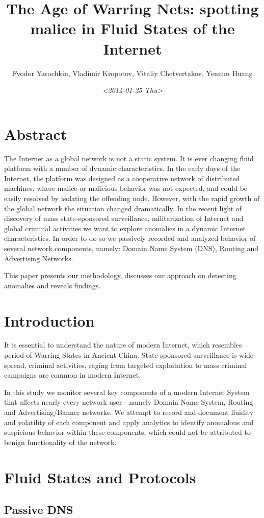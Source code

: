 \documentclass[times,5pt]{article}
\author{Fyodor Yarochkin, Vladimir Kropotov, Vitaliy Chetvertakov, Yennun Huang}
\date{\textit{<2014-01-25 Thu>}}
\title{The Age of Warring Nets: spotting malice in Fluid States of the Internet}
\begin{document}
\maketitle

\section*{Abstract}
\label{sec-1}

The Internet as a global network is not a static system. It is ever
changing fluid platform with a number of dynamic characteristics. In
the early days of the Internet, the platform was designed as a
cooperative network of distributed machines, where malice or malicious
behavior was not expected, and could be easily resolved by isolating
the offending node. However, with the rapid growth of the global
network the situation changed dramatically. In the recent light of
discovery of mass state-sponsored surveillance, militarization of
Internet and global criminal activities we want to explore anomalies
in a dynamic Internet characteristics. In order to do so we passively
recorded and analyzed behavior of several network components, namely:
Domain Name System (DNS), Routing and Advertising Networks.

This paper presents our methodology, discusses our approach on
detecting anomalies and reveals findings.
\section*{Introduction}
\label{sec-2}

It is essential to understand the nature of modern Internet, which
resembles period of Warring States in Ancient China. State-sponsored
surveillance is wide-spread, criminal activities, raging from
targeted exploitation to mass criminal campaigns are common in modern
Internet.

In this study we monitor several key components of a modern Internet
System that affects nearly every network user - namely Domain Name
System, Routing and Advertising/Banner networks. We attempt to record
and document fluidity and volatility of each component and apply
analytics to identify anomalous and suspicious behavior within these
components, which could not be attributed to benign functionality of
the network.
\section*{Fluid States and Protocols}
\label{sec-3}
\subsection*{Passive DNS}
\label{sec-3-1}
\end{document}
